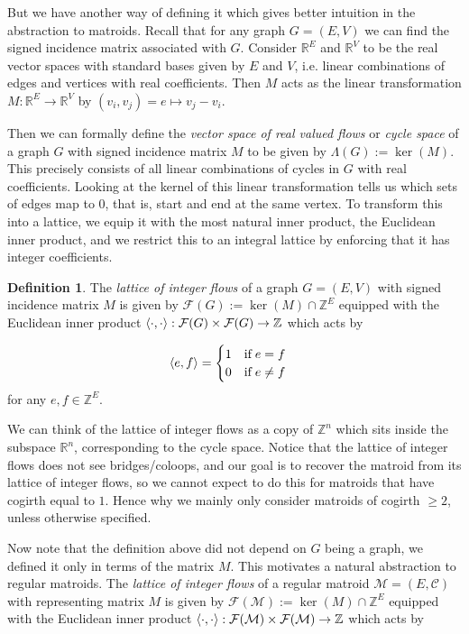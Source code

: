 \documentclass[12pt]{report}
\theoremstyle{definition}
\newtheorem{definition}[theorem]{Definition}
\DeclarePairedDelimiter\iprod{\langle}{\rangle}
\def\R{\mathbb R}
\def\Z{\mathbb Z}
\def\calC{\mathcal C}
\def\calF{\mathcal F}
\def\calM{\mathcal M}
\theoremstyle{upright}
\begin{document}
But we have another way of defining it which gives better intuition in the abstraction to matroids.
Recall that for any graph $G=(E, V)$ we can find the signed incidence matrix associated with $G$.
Consider $\R^E$ and $\R^V$ to be the real vector spaces with standard bases given by $E$ and $V$, i.e. linear combinations of edges and vertices with real coefficients.
Then $M$ acts as the linear transformation $M:\R^E\to\R^V$ by $(v_i, v_j)=e\mapsto v_j-v_i$.

Then we can formally define the {\em vector space of real valued flows} or {\em cycle space} of a graph $G$ with signed incidence matrix $M$ to be given by $\Lambda(G):=\ker(M)$.
This precisely consists of all linear combinations of cycles in $G$ with real coefficients.
Looking at the kernel of this linear transformation tells us which sets of edges map to $0$, that is, start and end at the same vertex.
To transform this into a lattice, we equip it with the most natural inner product, the Euclidean inner product, and we restrict this to an integral lattice by enforcing that it has integer coefficients.

\begin{definition}

    The {\em lattice of integer flows} of a graph $G=(E, V)$ with signed incidence matrix $M$ is given by $\calF(G):=\ker(M)\cap\Z^E$ equipped with the Euclidean inner product $\iprod*{\cdot, \cdot}:\calF(G)\times\calF(G)\to\Z$ which acts by

    \[\iprod*{e, f}=\begin{cases}
        1\quad\text{if}\;e=f\\
        0\quad\text{if}\;e\neq f
    \end{cases}\]
    for any $e,f\in\Z^E$.
    
\end{definition}

We can think of the lattice of integer flows as a copy of $\Z^n$ which sits inside the subspace $\R^n$, corresponding to the cycle space.
Notice that the lattice of integer flows does not see bridges/coloops, and our goal is to recover the matroid from its lattice of integer flows, so we cannot expect to do this for matroids that have cogirth equal to $1$.
Hence why we mainly only consider matroids of cogirth $\geq2$, unless otherwise specified.

Now note that the definition above did not depend on $G$ being a graph, we defined it only in terms of the matrix $M$.
This motivates a natural abstraction to regular matroids.
The {\em lattice of integer flows} of a regular matroid $\calM=(E, \calC)$ with representing matrix $M$ is given by $\calF(\calM):=\ker(M)\cap\Z^E$ equipped with the Euclidean inner product $\iprod*{\cdot, \cdot}:\calF(\calM)\times\calF(\calM)\to\Z$ which acts by
\end{document}
